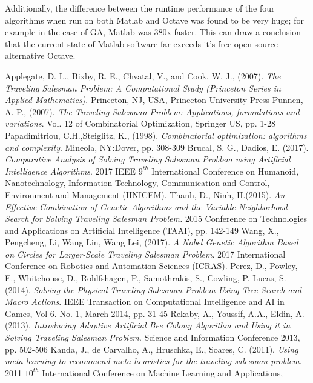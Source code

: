 \documentclass[twocolumn]{article}
\begin{document}
	Additionally, the difference between the runtime performance of the four algorithms when run on both {Matlab\texttrademark} and {Octave\texttrademark} was found to be very huge; for example in the case of GA, {Matlab\texttrademark} was 380x faster. This can draw a conclusion that the current state of {Matlab\texttrademark} software far exceeds it's free open source alternative {Octave\texttrademark}.
	\begin{thebibliography}{999}
		Applegate, D. L., Bixby, R. E., Chvatal, V.,  and Cook, W. J., (2007).
		\emph{The Traveling Salesman Problem: A Computational Study (Princeton Series in Applied Mathematics)}.
		Princeton, NJ, USA,
		Princeton University Press
		Punnen, A. P., (2007).
		\emph{The Traveling Salesman Problem: Applications, formulations and variations}.
		Vol. 12 of Combinatorial Optimization,
		Springer US,
		pp. 1-28
		Papadimitriou, C.H.,Steiglitz, K., (1998).
		\emph{Combinatorial optimization: algorithms and complexity}. Mineola, NY:Dover,
		pp. 308-309
		Brucal, S. G., Dadios, E. (2017).
		\emph{Comparative Analysis of Solving Traveling Salesman Problem using Artificial Intelligence Algorithms}.
		2017 IEEE $9^{th}$ International Conference on Humanoid, Nanotechnology, Information Technology, Communication and Control, Environment and Management (HNICEM).
		Thanh, D., Ninh, H.(2015).
		\emph{An Effective Combination of Genetic Algorithms and the Variable Neighborhood Search for Solving Traveling Salesman Problem.}
		2015 Conference on Technologies and Applications on Artificial Intelligence (TAAI),
		pp. 142-149
		Wang, X., Pengcheng, Li, Wang Lin, Wang Lei, (2017).
		\emph{A Nobel Genetic Algorithm Based on Circles for Larger-Scale Traveling Salesman Problem}. 2017 International Conference on Robotics and Automation Sciences (ICRAS).
		Perez, D., Powley, E., Whitehouse, D., Rohlfshagen, P., Samothrakis, S., Cowling, P. Lucas, S. (2014).
		\emph{Solving the Physical Traveling Salesman Problem Using Tree Search and Macro Actions}. IEEE Transaction on Computational Intelligence and AI in Games, Vol 6. No. 1, March 2014,
		pp. 31-45
		Rekaby, A., Youssif, A.A., Eldin, A. (2013).
		\emph{Introducing Adaptive Artificial Bee Colony Algorithm and Using it in Solving Traveling Salesman Problem}.
		Science and Information Conference 2013,
		pp. 502-506
		Kanda, J., de Carvalho, A., Hruschka, E., Soares, C. (2011).
		\emph{Using meta-learning to recommend meta-heuristics for the traveling salesman problem}. 2011 $10^{th}$ International Conference on Machine Learning and Applications,

\end{thebibliography}
\end{document}
